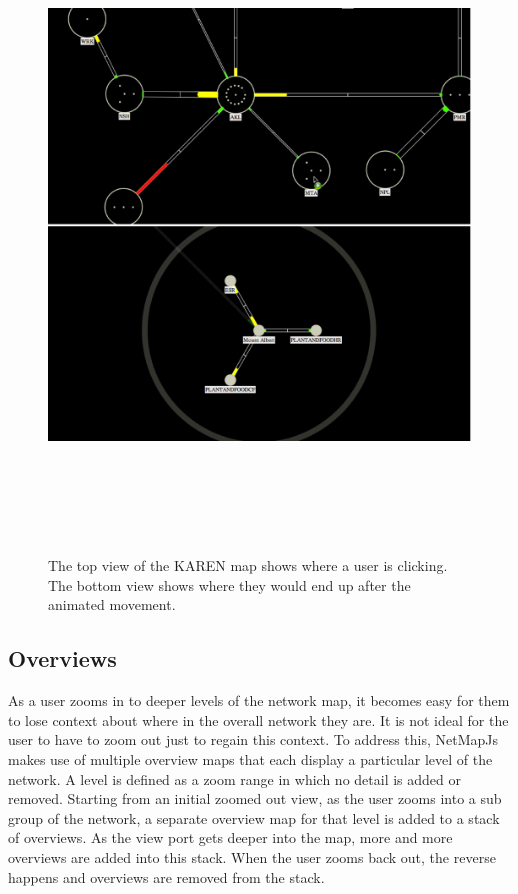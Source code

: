 \documentclass[11pt, a4paper]{article}
\begin{document}
\begin{figure}
\centering
\includegraphics[width=170mm,height=173.22mm]{assets/nav1-2.eps}
\caption{The top view of the KAREN map shows where a user is clicking. The bottom
view shows where they would end up after the animated movement.}
\label{fig:nav1.2}
\end{figure}

\subsection{Overviews}
\label{sec:overviews.vis}

As a user zooms in to deeper levels of the network map, it becomes easy for them
to lose context about where in the overall network they are. It is not ideal for
the user to have to zoom out just to regain this context. To address this,
NetMapJs makes use of multiple overview maps that each display a particular
level of the network. A level is defined as a zoom range in which no detail is
added or removed. Starting from an initial zoomed out view, as the user zooms
into a sub group of the network, a separate overview map for that level is added
to a stack of overviews. As the view port gets deeper into the map, more and
more overviews are added into this stack. When the user zooms back out, the
reverse happens and overviews are removed from the stack.
\end{document}
